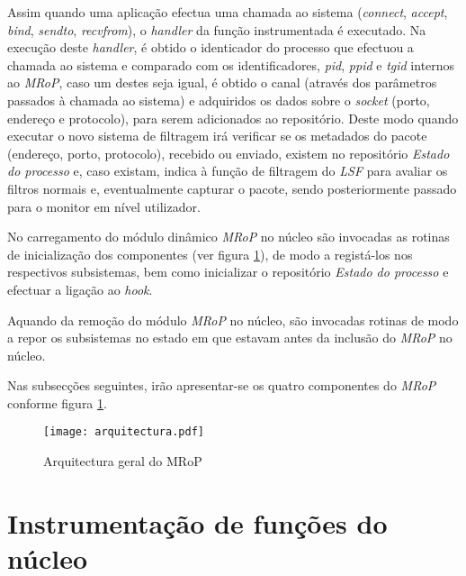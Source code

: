 Assim quando uma aplicação efectua uma chamada ao sistema (\textit{connect}, \textit{accept}, \textit{bind}, \textit{sendto}, \textit{recvfrom}), o \textit{handler} da função instrumentada é executado.
Na execução deste \textit{handler}, é obtido o identicador do processo que efectuou a chamada ao sistema e comparado com os identificadores, \textit{pid}, \textit{ppid} e \textit{tgid} internos ao \textit{MRoP}, caso um destes seja igual, é obtido o canal (através dos parâmetros passados à chamada ao sistema) e adquiridos os dados sobre o \textit{socket} (porto, endereço e protocolo), para serem adicionados ao repositório.
Deste modo quando executar o novo sistema de filtragem irá verificar se os metadados do pacote (endereço, porto, protocolo), recebido ou enviado, existem no repositório \textit{Estado do processo} e, caso existam, indica à função de filtragem do \textit{LSF} para avaliar os filtros normais e, eventualmente capturar o pacote, sendo posteriormente passado para o monitor em nível utilizador.

No carregamento do módulo dinâmico \textit{MRoP} no núcleo são invocadas as rotinas de inicialização dos componentes (ver figura \ref{fig:general_architecture}), de modo a registá-los nos respectivos subsistemas, bem como inicializar o repositório \textit{Estado do processo} e efectuar a ligação ao \textit{hook}.

Aquando da remoção do módulo \textit{MRoP} no núcleo, são invocadas rotinas de modo a repor os subsistemas no estado em que estavam antes da inclusão do \textit{MRoP} no núcleo.


Nas subsecções seguintes, irão apresentar-se os quatro componentes do \textit{MRoP} conforme figura \ref{fig:general_architecture}.

\begin{figure}[!htbp]
\centering
\texttt{[image: arquitectura.pdf]}
\caption{Arquitectura geral do MRoP}
\label{fig:general_architecture}
\end{figure}



\section{Instrumentação de funções do núcleo}

